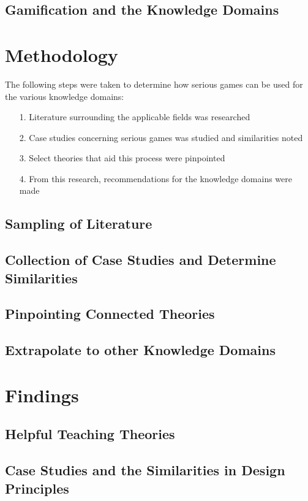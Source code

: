 \documentclass[conference]{IEEEtran}
\begin{document}
\subsection{Gamification and the Knowledge Domains}

\section{Methodology}
The following steps were taken to determine how serious games can be used for the various knowledge domains:

\begin{itemize}
\item[1.] Literature surrounding the applicable fields was researched
\item[2.] Case studies concerning serious games was studied and similarities noted
\item[3.] Select theories that aid this process were pinpointed
\item[4.] From this research, recommendations for the knowledge domains were made
\end{itemize}

\subsection{Sampling of Literature}
\subsection{Collection of Case Studies and Determine Similarities}
\subsection{Pinpointing Connected Theories}
\subsection{Extrapolate to other Knowledge Domains}

\section{Findings}
\subsection{Helpful Teaching Theories}
\subsection{Case Studies and the Similarities in Design Principles}
\end{document}
